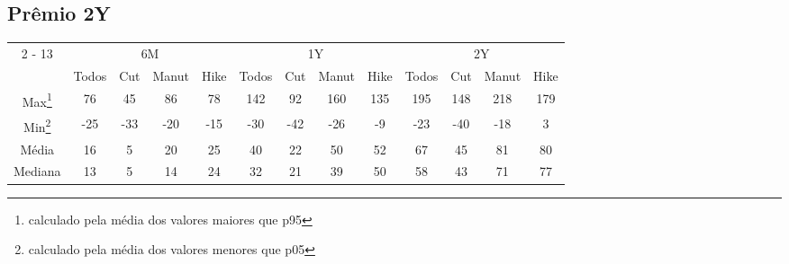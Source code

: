 \documentclass{article}%
\begin{document}
\subsection{Prêmio 2Y}%
\label{subsec:Prmio2Y}%
\begin{minipage}{\textwidth}%
\vspace*{0.4in}%
\centering%
\hspace*{-0.3in}%
%
%
\begin{tabular}{c c c c c c c c c c c c c }%
\cline{2%
-%
13}%
&\multicolumn{4}{|c|}{6M}&\multicolumn{4}{c|}{1Y}&\multicolumn{4}{c|}{2Y}\\%
&\multicolumn{1}{|c}{Todos}&\multicolumn{1}{c}{Cut}&\multicolumn{1}{c}{Manut}&\multicolumn{1}{c|}{Hike}&\multicolumn{1}{c}{Todos}&\multicolumn{1}{c}{Cut}&\multicolumn{1}{c}{Manut}&\multicolumn{1}{c|}{Hike}&\multicolumn{1}{c}{Todos}&\multicolumn{1}{c}{Cut}&\multicolumn{1}{c}{Manut}&\multicolumn{1}{c|}{Hike}\\%
\hline%
\multicolumn{1}{|c|}{Max\footnote{calculado pela média dos valores maiores que p95}}&\multicolumn{1}{c}{76}&\multicolumn{1}{c}{45}&\multicolumn{1}{c}{86}&\multicolumn{1}{c|}{78}&\multicolumn{1}{c}{142}&\multicolumn{1}{c}{92}&\multicolumn{1}{c}{160}&\multicolumn{1}{c|}{135}&\multicolumn{1}{c}{195}&\multicolumn{1}{c}{148}&\multicolumn{1}{c}{218}&\multicolumn{1}{c|}{179}\\%
\hline%
\multicolumn{1}{|c|}{Min\footnote{calculado pela média dos valores menores que p05}}&\multicolumn{1}{c}{{-}25}&\multicolumn{1}{c}{{-}33}&\multicolumn{1}{c}{{-}20}&\multicolumn{1}{c|}{{-}15}&\multicolumn{1}{c}{{-}30}&\multicolumn{1}{c}{{-}42}&\multicolumn{1}{c}{{-}26}&\multicolumn{1}{c|}{{-}9}&\multicolumn{1}{c}{{-}23}&\multicolumn{1}{c}{{-}40}&\multicolumn{1}{c}{{-}18}&\multicolumn{1}{c|}{3}\\%
\hline%
\multicolumn{1}{|c|}{Média}&\multicolumn{1}{c}{16}&\multicolumn{1}{c}{5}&\multicolumn{1}{c}{20}&\multicolumn{1}{c|}{25}&\multicolumn{1}{c}{40}&\multicolumn{1}{c}{22}&\multicolumn{1}{c}{50}&\multicolumn{1}{c|}{52}&\multicolumn{1}{c}{67}&\multicolumn{1}{c}{45}&\multicolumn{1}{c}{81}&\multicolumn{1}{c|}{80}\\%
\hline%
\multicolumn{1}{|c|}{Mediana}&\multicolumn{1}{c}{13}&\multicolumn{1}{c}{5}&\multicolumn{1}{c}{14}&\multicolumn{1}{c|}{24}&\multicolumn{1}{c}{32}&\multicolumn{1}{c}{21}&\multicolumn{1}{c}{39}&\multicolumn{1}{c|}{50}&\multicolumn{1}{c}{58}&\multicolumn{1}{c}{43}&\multicolumn{1}{c}{71}&\multicolumn{1}{c|}{77}\\%

\end{tabular}
\end{minipage}
\end{document}
